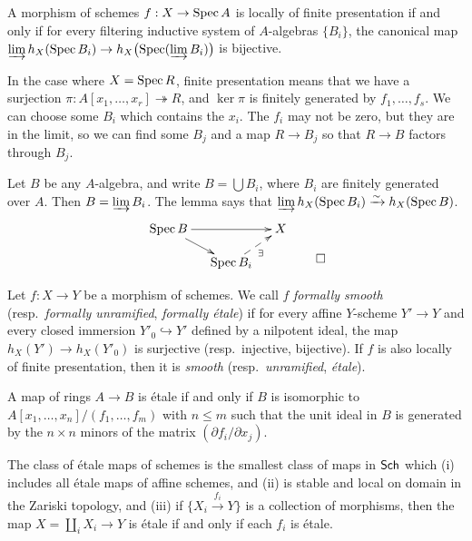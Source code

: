\begin{lemma}
 A morphism of schemes $f:X\to \operatorname{Spec} A$ is locally of finite presentation if and only if for every filtering inductive system of $A$-algebras $\{B_i\}$, the canonical map $\varinjlim h_X(\operatorname{Spec} B_i)\to h_X\bigl(\operatorname{Spec} (\varinjlim B_i)\bigr)$ is bijective.
\end{lemma}
In the case where $X=\operatorname{Spec} R$, finite presentation means that we have a surjection $\pi:A[x_1,\dots, x_r]\twoheadrightarrow R$, and $\ker \pi$ is finitely generated by $f_1,\dots, f_s$. We can choose some $B_i$ which contains the $x_i$. The $f_i$ may not be zero, but they are in the limit, so we can find some $B_j$ and a map $R\to B_j$ so that $R\to B$ factors through $B_j$.
\begin{example}
 Let $B$ be any $A$-algebra, and write $B=\bigcup B_i$, where $B_i$ are finitely generated over $A$. Then $B=\varinjlim B_i$. The lemma says that $\varinjlim h_X(\operatorname{Spec} B_i)\xrightarrow\sim h_X(\operatorname{Spec} B)$.
 \[\raisebox{2pc}{$\xymatrix@C-1pc @R-1pc{
  \spec B\ar[dr] \ar[rr] & & X\\
  & \spec B_{i} \ar@{-->}[ur]_{\exists}
 }$}\qedhere\]
\end{example}
\begin{definition}
 Let $f:X\to Y$ be a morphism of schemes. We call $f$ \emph{formally smooth} (resp.~\emph{formally unramified}, \emph{formally \'etale}) if for every affine $Y$-scheme $Y'\to Y$ and every closed immersion $Y'_0\hookrightarrow Y'$ defined by a nilpotent ideal, the map $h_X(Y')\to h_X(Y'_0)$ is surjective (resp.~injective, bijective). If $f$ is also locally of finite presentation, then it is \emph{smooth} (resp.~\emph{unramified}, \emph{\'etale}).
\end{definition}
\begin{proposition}
 A map of rings $A\to B$ is \'etale if and only if $B$ is isomorphic to $A[x_1,\dots, x_n]/(f_1,\dots, f_m)$ with $n\le m$ such that the unit ideal in $B$ is generated by the $n\times n$ minors of the matrix $(\partial f_i/\partial x_j)$.
\end{proposition}
\begin{remark}
 The class of \'etale maps of schemes is the smallest class of maps in $\text{\sf Sch}$ which (i) includes all \'etale maps of affine schemes, and (ii) is stable and local on domain in the Zariski topology, and (iii) if $\{X_i\xrightarrow{f_i}Y\}$ is a collection of morphisms, then the map $X=\coprod_i X_i\to Y$ is \'etale if and only if each $f_i$ is \'etale. 
\end{remark}